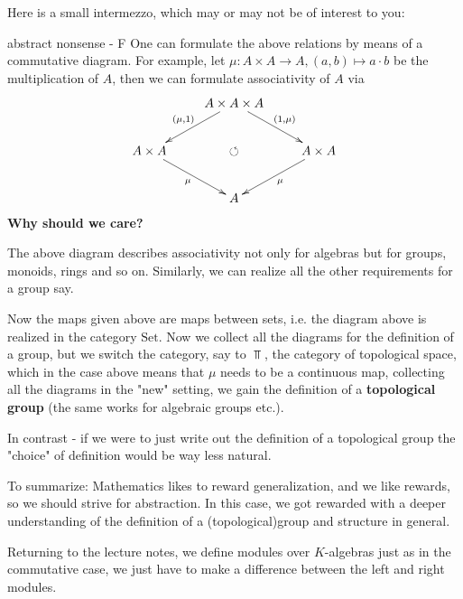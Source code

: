 \documentclass[twoside = false,	%
		headsepline,		%
		parskip = true,
		]{scrbook}						%
\begin{document}
        Here is a small intermezzo, which may or may not be of interest to you:
        
        \begin{remark*}{abstract nonsense - F}
            One can formulate the above relations by means of a commutative diagram. For example, let $\mu: A \times A \to A, (a,b) \mapsto a \cdot b$ be the multiplication of $A$, then we can formulate associativity of $A$ via
            \begin{equation*}
                \xymatrix {
                & A \times A \times A \ar[dl]_{(\mu,1)} \ar[dr]^{(1,\mu)}& \\
                A \times A \ar[dr]_{\mu} & \circlearrowleft & A \times A\ar[dl]^{\mu} \\
                & A & 
                }
            \end{equation*}
            \textbf{Why should we care?}
            
            The above diagram describes associativity not only for algebras but for groups, monoids, rings and so on. Similarly, we can realize all the other requirements for a group say.
            
            Now the maps given above are maps between sets, i.e. the diagram above is realized in the category $\mathrm{Set}$. Now we collect all the diagrams for the definition of a group, but we switch the category, say to $\Top$, the category of topological space, which in the case above means that $\mu$ needs to be a continuous map, collecting all the diagrams in the "new" setting, we gain the definition of a \textbf{topological group} (the same works for algebraic groups etc.).
            
            In contrast - if we were to just write out the definition of a topological group the "choice" of definition would be way less natural.

            To summarize: Mathematics likes to reward generalization, and we like rewards, so we should strive for abstraction. In this case, we got rewarded with a deeper understanding of the definition of a (topological)group and structure in general.
        \end{remark*}

        Returning to the lecture notes, we define modules over $K$-algebras just as in the commutative case, we just have to make a difference between the left and right modules.
\end{document}
